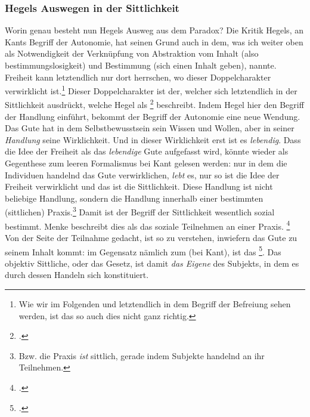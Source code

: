 \documentclass[12pt, a4paper, openany]{report}
\begin{document}
\subsubsection{Hegels Auswegen in der Sittlichkeit}
Worin genau besteht nun Hegels Ausweg aus dem Paradox?
Die Kritik Hegels, an Kants Begriff der Autonomie, hat seinen Grund auch in dem, was ich weiter oben als Notwendigkeit der Verknüpfung von Abstraktion vom Inhalt (also bestimmungslosigkeit) und Bestimmung (sich einen Inhalt geben), nannte. 
Freiheit kann letztendlich nur dort herrschen, wo dieser Doppelcharakter verwirklicht ist.\footnote{Wie wir im Folgenden und letztendlich in dem Begriff der Befreiung sehen werden, ist das so auch dies nicht ganz richtig.}
Dieser Doppelcharakter ist der, welcher sich letztendlich in der Sittlichkeit ausdrückt, welche Hegel als \footcite[][§142, S. 161. Hervorhebung von mir]{hegel_grundlinien_2017} beschreibt.
Indem Hegel hier den Begriff der Handlung einführt, bekommt der Begriff der Autonomie eine neue Wendung. 
Das Gute hat in dem Selbstbewusstsein sein Wissen und Wollen, aber in seiner \emph{Handlung} seine Wirklichkeit. 
Und in dieser Wirklichkeit erst ist es \emph{lebendig}.
Dass die Idee der Freiheit als das \emph{lebendige} Gute aufgefasst wird, könnte wieder als Gegenthese zum leeren Formalismus bei Kant gelesen werden:
nur in dem die Individuen handelnd das Gute verwirklichen, \emph{lebt} es, nur so ist die Idee der Freiheit verwirklicht und das ist die Sittlichkeit.
Diese Handlung ist nicht beliebige Handlung, sondern die Handlung innerhalb einer bestimmten (sittlichen) Praxis.\footnote{Bzw. die Praxis \emph{ist} sittlich, gerade indem Subjekte handelnd an ihr Teilnehmen.}
Damit ist der Begriff der Sittlichkeit wesentlich sozial bestimmt.
Menke beschreibt dies als das soziale Teilnehmen an einer Praxis. \footcite[Vgl.][28 ff]{menke_autonomie_2018}
Von der Seite der Teilnahme gedacht, ist so zu verstehen, inwiefern das Gute zu seinem Inhalt kommt: im Gegensatz nämlich zum  (bei Kant), ist das \footcite[][§144, S. 161.]{hegel_grundlinien_2017}.
Das objektiv Sittliche, oder das Gesetz, ist damit \emph{das Eigene} des Subjekts, in dem es durch dessen Handeln sich konstituiert. 
\end{document}
